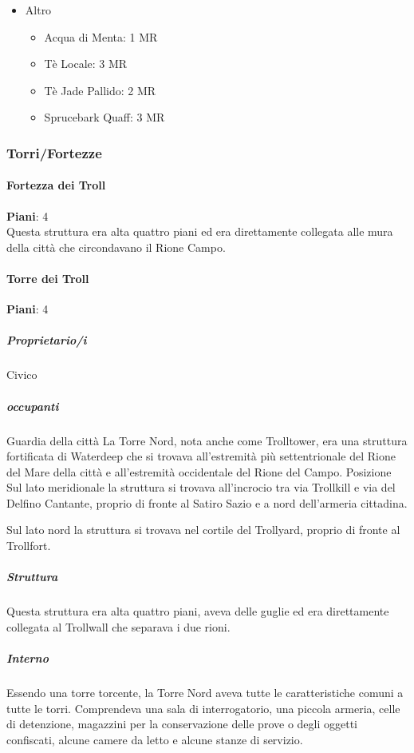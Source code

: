 \documentclass{article}
\begin{document}
\begin{itemize}
\begin{itemize}
\item Altro
\begin{itemize}
    \item Acqua di Menta: 1 MR
    \item Tè Locale: 3 MR
    \item Tè Jade Pallido: 2 MR
    \item Sprucebark Quaff: 3 MR
\end{itemize}
\end{itemize}
\end{itemize}



\subsubsection{Torri/Fortezze}

\paragraph{Fortezza dei Troll}
\textbf{Piani}: 4\\
Questa struttura era alta quattro piani ed era direttamente collegata alle mura della città che circondavano il Rione Campo.
\paragraph{Torre dei Troll}
\textbf{Piani}: 4\\
\subparagraph{Proprietario/i}
Civico
\subparagraph{occupanti}
Guardia della città
La Torre Nord, nota anche come Trolltower, era una struttura fortificata di Waterdeep che si trovava all'estremità più settentrionale del Rione del Mare della città e all'estremità occidentale del Rione del Campo.
Posizione
Sul lato meridionale la struttura si trovava all'incrocio tra via Trollkill e via del Delfino Cantante, proprio di fronte al Satiro Sazio e a nord dell'armeria cittadina.

Sul lato nord la struttura si trovava nel cortile del Trollyard, proprio di fronte al Trollfort.

\subparagraph{Struttura}
Questa struttura era alta quattro piani, aveva delle guglie ed era direttamente collegata al Trollwall che separava i due rioni.

\subparagraph{Interno}
Essendo una torre torcente, la Torre Nord aveva tutte le caratteristiche comuni a tutte le torri. Comprendeva una sala di interrogatorio, una piccola armeria, celle di detenzione, magazzini per la conservazione delle prove o degli oggetti confiscati, alcune camere da letto e alcune stanze di servizio.
\end{document}
